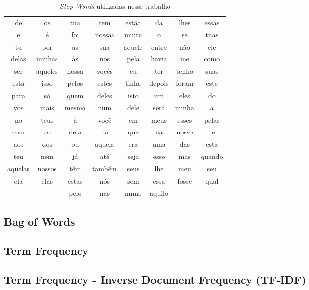           \begin{table}[h]\label{tb:stopwords}
            \centering
            \begin{tabular}{cccccccc}
            \cline{1-8}
            de & os & tua & tem & estão & da & lhes & essas \\
            e & é & foi & nossas & muito & o & se & tuas \\
            tu & por & as & sua & aquele & entre & não & ele \\
            delas & minhas & às & nos & pela & havia & me & como \\
            ser & aqueles & nossa & vocês & eu & ter & tenho & suas \\
            está & isso & pelos & estes & tinha & depois & foram & este \\
            para & só & quem & deles & isto & um & eles & do \\
            vos & mais & mesmo & num & dele & será & minha & a \\
            no & teus & à & você & em & meus & esses & pelas \\
            com & ao & dela & há & que & na & nosso & te \\
            aos & dos & ou & aquela & era & uma & das & esta \\
            teu & nem & já & até & seja & esse & mas & quando \\
            aquelas & nossos & têm & também & seus & lhe & meu & seu \\
            ela & elas & estas & nós & sem & essa & fosse & qual \\
            & & pelo & nas & numa & aquilo & & \\
            \cline{1-8}
            \end{tabular}
            \caption{\textit{Stop Words} utilizadas nesse trabalho}
            \label{exemplos-stop-words}
            \end{table}
            
  

  \subsection{Bag of Words}
  \subsection{Term Frequency}
  \subsection{Term Frequency - Inverse Document Frequency (TF-IDF)}




